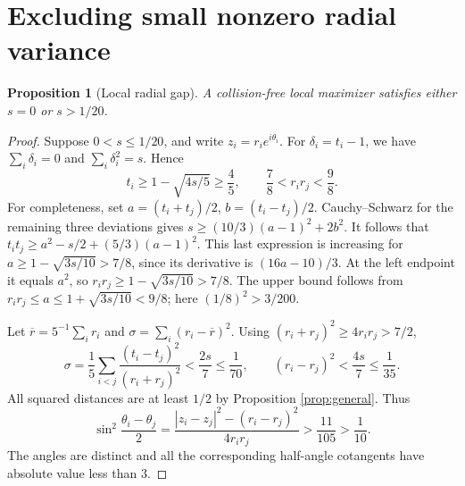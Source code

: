 \documentclass[11pt]{article}
\newtheorem{proposition}[theorem]{Proposition}
\theoremstyle{remark}
\numberwithin{equation}{section}
\begin{document}
\section{Excluding small nonzero radial variance}
\begin{proposition}[Local radial gap]\label{prop:gap}
A collision-free local maximizer satisfies either $s=0$ or $s>1/20$.
\end{proposition}
\begin{proof}
Suppose $0<s\le1/20$, and write $z_i=r_i e^{i\theta_i}$.
For $\delta_i=t_i-1$, we have $\sum_i\delta_i=0$ and
$\sum_i\delta_i^2=s$. Hence
\begin{equation}\label{eq:local-radii}
 t_i\ge1-\sqrt{4s/5}\ge\frac45,\qquad
 \frac78<r_ir_j<\frac98.
\end{equation}
For completeness, set $a=(t_i+t_j)/2$, $b=(t_i-t_j)/2$.
Cauchy--Schwarz for the remaining three deviations gives
$s\ge(10/3)(a-1)^2+2b^2$.
It follows that
$t_i t_j\ge a^2-s/2+(5/3)(a-1)^2$.
This last expression is increasing for
$a\ge1-\sqrt{3s/10}>7/8$, since its derivative is $(16a-10)/3$.
At the left endpoint it equals $a^2$, so
$r_ir_j\ge1-\sqrt{3s/10}>7/8$.
The upper bound follows from $r_ir_j\le a\le1+\sqrt{3s/10}<9/8$;
here $(1/8)^2>3/200$.

Let $\overline r=5^{-1}\sum_i r_i$ and
$\sigma=\sum_i(r_i-\overline r)^2$.
Using $(r_i+r_j)^2\ge4r_ir_j>7/2$,
\begin{equation}\label{eq:sigma}
 \sigma=\frac15\sum_{i<j}
       \frac{(t_i-t_j)^2}{(r_i+r_j)^2}
 <\frac{2s}{7}\le\frac1{70},\qquad
 (r_i-r_j)^2<\frac{4s}{7}\le\frac1{35}.
\end{equation}
All squared distances are at least $1/2$ by
Proposition \ref{prop:general}. Thus
\[
 \sin^2\frac{\theta_i-\theta_j}{2}
 =\frac{|z_i-z_j|^2-(r_i-r_j)^2}{4r_ir_j}
 >\frac{11}{105}>\frac1{10}.
\]
The angles are distinct and all the corresponding half-angle cotangents
have absolute value less than $3$.


\end{proof}
\end{document}
